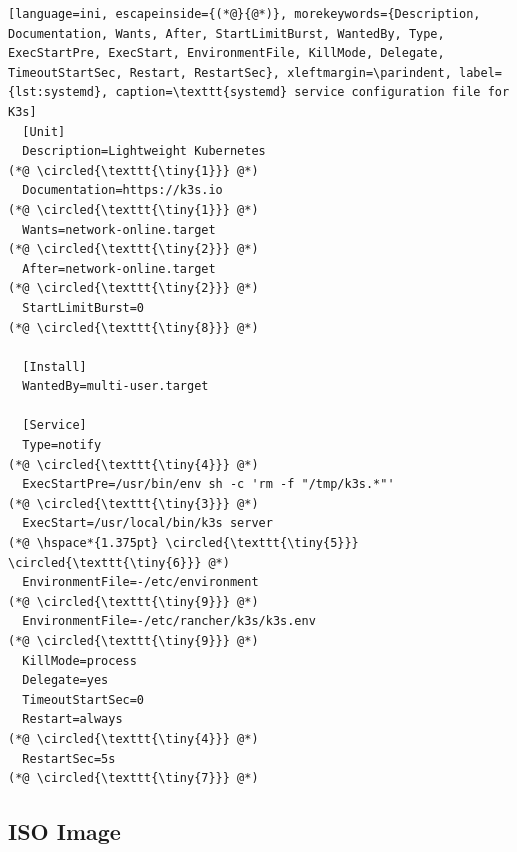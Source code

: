 \begin{lstlisting}[language=ini, escapeinside={(*@}{@*)}, morekeywords={Description, Documentation, Wants, After, StartLimitBurst, WantedBy, Type, ExecStartPre, ExecStart, EnvironmentFile, KillMode, Delegate, TimeoutStartSec, Restart, RestartSec}, xleftmargin=\parindent, label={lst:systemd}, caption=\texttt{systemd} service configuration file for K3s]
  [Unit]
  Description=Lightweight Kubernetes                                                              (*@ \circled{\texttt{\tiny{1}}} @*)
  Documentation=https://k3s.io                                                                    (*@ \circled{\texttt{\tiny{1}}} @*)
  Wants=network-online.target                                                                     (*@ \circled{\texttt{\tiny{2}}} @*)
  After=network-online.target                                                                     (*@ \circled{\texttt{\tiny{2}}} @*)
  StartLimitBurst=0                                                                               (*@ \circled{\texttt{\tiny{8}}} @*)

  [Install]
  WantedBy=multi-user.target

  [Service]
  Type=notify                                                                                     (*@ \circled{\texttt{\tiny{4}}} @*)
  ExecStartPre=/usr/bin/env sh -c 'rm -f "/tmp/k3s.*"'                                            (*@ \circled{\texttt{\tiny{3}}} @*)
  ExecStart=/usr/local/bin/k3s server                                                         (*@ \hspace*{1.375pt} \circled{\texttt{\tiny{5}}} \circled{\texttt{\tiny{6}}} @*)
  EnvironmentFile=-/etc/environment                                                               (*@ \circled{\texttt{\tiny{9}}} @*)
  EnvironmentFile=-/etc/rancher/k3s/k3s.env                                                       (*@ \circled{\texttt{\tiny{9}}} @*)
  KillMode=process
  Delegate=yes
  TimeoutStartSec=0
  Restart=always                                                                                  (*@ \circled{\texttt{\tiny{4}}} @*)
  RestartSec=5s                                                                                   (*@ \circled{\texttt{\tiny{7}}} @*)
\end{lstlisting}

\subsection{ISO Image}
\label{subsec:implementation_distributions_iso_image}

